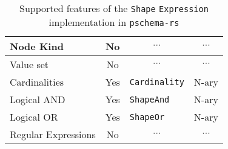 \begin{table}[ht]
\begin{tabular}{|l|c|l|c|}
        Node Kind                                                      & {\color[HTML]{FE0000} No}  & \multicolumn{1}{c|}{$\cdots$}                                                & \multicolumn{1}{c|}{$\cdots$}                                       \\ \hline
        Value set                                                      & {\color[HTML]{FE0000} No}  & \multicolumn{1}{c|}{$\cdots$}                                                & \multicolumn{1}{c|}{$\cdots$}                                       \\ \hline
        Cardinalities                                                  & {\color[HTML]{009901} Yes} & \texttt{Cardinality}                                                         & N-ary                                                               \\ \hline
        Logical AND                                                    & {\color[HTML]{009901} Yes} & \texttt{ShapeAnd}                                                            & N-ary                                                               \\ \hline
        Logical OR                                                     & {\color[HTML]{009901} Yes} & \texttt{ShapeOr}                                                             & N-ary                                                               \\ \hline
        Regular Expressions                                            & {\color[HTML]{FE0000} No}  & \multicolumn{1}{c|}{$\cdots$}                                                & \multicolumn{1}{c|}{$\cdots$}                                       \\ \hline
    \end{tabular}
    \caption{Supported features of the \texttt{Shape} \texttt{Expression} implementation in \texttt{pschema-rs}}
\end{table}


